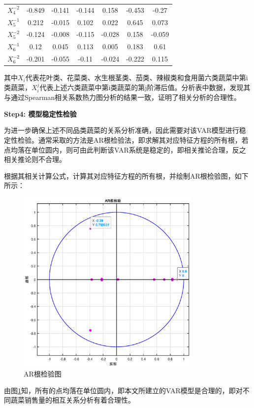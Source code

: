\documentclass{my_paper}
\begin{document}
\begin{itemize}
\begin{table}[H]
\begin{tabular}{ccccccc}
        $X_4^{-2}$ & -0.849 & -0.141 & -0.144 & 0.158 & -0.453 & -0.27 \\
        $X_5^{-1}$ & 0.212 & -0.015 & 0.102 & 0.022 & 0.645 & 0.073 \\ 
        $X_5^{-2}$ & -0.124 & -0.008 & -0.115 & -0.028 & 0.158 & -0.059 \\ 
        $X_6^{-1}$ & 0.12 & 0.045 & 0.113 & 0.005 & 0.183 & 0.61 \\ 
        $X_6^{-2}$ & -0.201 & -0.055 & -0.11 & -0.024 & -0.222 & 0.115 \\ 
        \bottomrule
    \end{tabular}
\end{table}
其中$X_i$代表花叶类、花菜类、水生根茎类、茄类、辣椒类和食用菌六类蔬菜中第i类蔬菜，$X_i^j$代表上述六类蔬菜中第i类蔬菜的第j阶滞后值。分析表中数据，发现其与通过Spearman相关系数热力图分析的结果一致，证明了相关分析的合理性。\par
\vspace{0.5cm}
\textbf{Step4: 模型稳定性检验}\par
为进一步确保上述不同品类蔬菜的关系分析准确，因此需要对该VAR模型进行稳定性检验。通常采取的方法是AR根检验法，即求解其对应特征方程的所有根，若点均落在单位圆内，则可由此判断该VAR系统是稳定的，即相关推论合理，反之相关推论则不合理。\par
根据其相关计算公式，计算其对应特征方程的所有根，并绘制AR根检验图，如下所示：
\begin{figure}[H]
 \centering
 \includegraphics[width=0.8\textwidth]{AR根检验图.eps} 
 \caption{AR根检验图} %
 \label{AR根检验图} %
\end{figure}\par
由图\ref{AR根检验图}知，所有的点均落在单位圆内，即本文所建立的VAR模型是合理的，即对不同蔬菜销售量的相互关系分析有着合理性。\par
\end{itemize}
\end{document}
